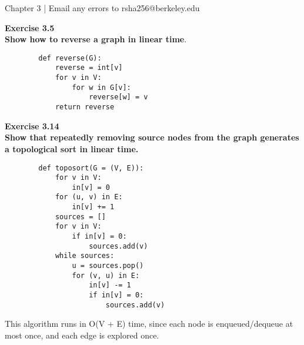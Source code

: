 \documentclass{article}
\newenvironment{problem}[2][Exercise]
    { \begin{mdframed}[backgroundcolor=gray!20] \textbf{#1 #2} \\}
    {  \end{mdframed}}
\begin{document}
\begin{mdframed}[backgroundcolor=blue!20]
Chapter 3 | Email any errors to rsha256@berkeley.edu
\end{mdframed}

\begin{problem}{3.5}
    \textbf{Show how to reverse a graph in linear time}.
    \begin{lstlisting}
        def reverse(G):
            reverse = int[v]
            for v in V:
                for w in G[v]:
                    reverse[w] = v
            return reverse
    \end{lstlisting}
\end{problem}

\begin{problem}{3.14}
    \textbf{Show that repeatedly removing source nodes from the graph generates a topological sort in linear time.}
    \begin{lstlisting}
        def toposort(G = (V, E)):
            for v in V: 
                in[v] = 0
            for (u, v) in E:
                in[v] += 1
            sources = []
            for v in V:
                if in[v] = 0:
                    sources.add(v)
            while sources:
                u = sources.pop()
                for (v, u) in E:
                    in[v] -= 1
                    if in[v] = 0:
                        sources.add(v)
    \end{lstlisting}
    This algorithm runs in O(V + E) time, since each node is enqueued/dequeue at most once, and each edge is explored once.
\end{problem}
\end{document}
